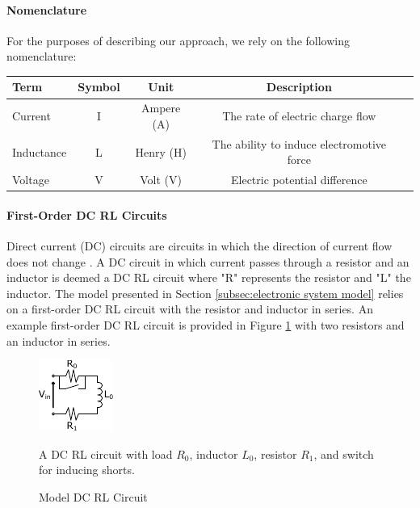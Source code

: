 \paragraph{Nomenclature}
For the purposes of describing our approach, we rely on the following nomenclature:

\begin{center}
\bgroup
\begin{tabular}{| l | c | c | c | l |}
    \hline
    Term & Symbol & Unit & Description\\  \hline \hline \cline{1-4}
    Current & I & Ampere (A) & The rate of electric charge flow \\ \cline{1-4}
    Inductance & L & Henry (H) & The ability to induce electromotive force\\ \cline{1-4}
    Voltage & V & Volt (V) & Electric potential difference \\ \cline{1-4}
    \hline  
\end{tabular}
\egroup
\end{center}

\paragraph{First-Order DC RL Circuits}
Direct current (DC) circuits are circuits in which the direction of current flow does not change \cite{young_sears_2012}.
A DC circuit in which current passes through a resistor and an inductor is deemed a DC RL circuit where "R" represents the resistor and "L" the inductor.
The model presented in Section \ref{subsec:electronic system model} relies on a first-order DC RL circuit with the resistor and inductor in series.
An example first-order DC RL circuit is provided in Figure \ref{fig:ModelDCRL} with two resistors and an inductor in series.
\begin{figure}
    \centering
    \includegraphics[width=0.25\linewidth]{fig/Model_DC_RL_Circuit_General.pdf}
    \caption{Model DC RL Circuit} A DC RL circuit with load $R_0$, inductor $L_0$, resistor $R_1$, and switch for inducing shorts.
    \label{fig:ModelDCRL}
\end{figure}
